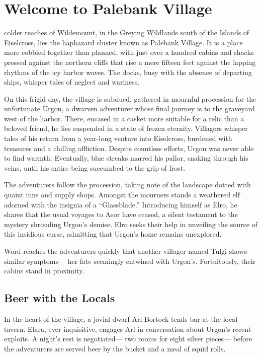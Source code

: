 \documentclass[
  letterpaper,12pt,twoside,twocolumn,openany,
  nodeprecatedcode,bg=full]{dndbook}
\begin{document}
\chapter{Welcome to Palebank Village}\label{welcome-to-palebank-village}

\hfill\break colder
reaches of Wildemount, in the Greying Wildlands south of the Islands of
Eiselcross, lies the haphazard cluster known as Palebank Village. It is
a place more cobbled together than planned, with just over a hundred
cabins and shacks pressed against the northern cliffs that rise a mere
fifteen feet against the lapping rhythms of the icy harbor waves. The
docks, busy with the absence of departing ships, whisper tales of
neglect and wariness.

On this frigid day, the village is subdued, gathered in mournful
procession for the unfortunate Urgon, a dwarven adventurer whose final
journey is to the graveyard west of the harbor. There, encased in a
casket more suitable for a relic than a beloved friend, he lies
suspended in a state of frozen eternity. Villagers whisper tales of his
return from a year-long venture into Eiselcross, burdened with treasures
and a chilling affliction. Despite countless efforts, Urgon was never
able to find warmth. Eventually, blue streaks marred his pallor, snaking
through his veins, until his entire being succumbed to the grip of
frost.

The adventurers follow the procession, taking note of the landscape
dotted with quaint inns and supply shops. Amongst the mourners stands a
weathered elf adorned with the insignia of a ``Glassblade.'' Introducing
himself as Elro, he shares that the usual voyages to Aeor have ceased, a
silent testament to the mystery shrouding Urgon's demise. Elro seeks
their help in unveiling the source of this insidious curse, admitting
that Urgon's home remains unexplored.

Word reaches the adventurers quickly that another villager named Tulgi
shows similar symptoms--- her fate seemingly entwined with Urgon's.
Fortuitously, their cabins stand in proximity.

\section{Beer with the Locals}\label{beer-with-the-locals}

In the heart of the village, a jovial dwarf Arl Bortock tends bar at the
local tavern. Elara, ever inquisitive, engages Arl in conversation about
Urgon's recent exploits. A night's rest is negotiated--- two rooms for
eight silver pieces--- before the adventurers are served beer by the
bucket and a meal of squid rolls.
\end{document}

